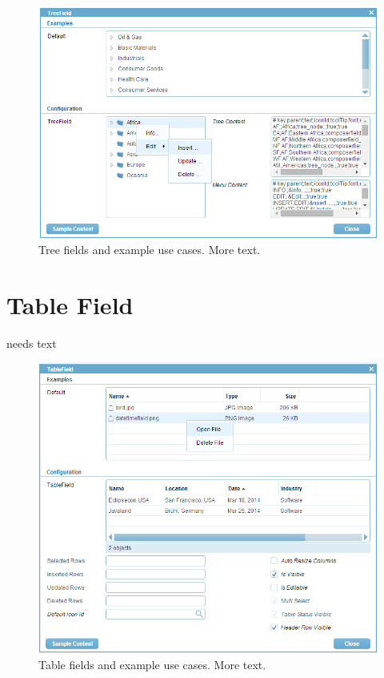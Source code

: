 \documentclass[a4paper,10pt,twoside]{book}
\begin{document}
{\begin{figure}
\includegraphics[width=15cm]{treefield.png}
\caption{Tree fields and example use cases.
More text.}
\end{figure}

\section{Table Field}
needs text

\begin{figure}
\includegraphics[width=15cm]{tablefield.png}
\caption{Table fields and example use cases.
More text.}
\end{figure}

}
\end{document}
